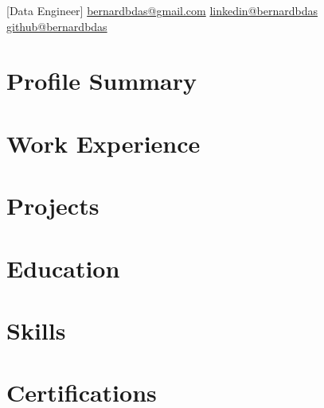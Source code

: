 \documentclass{main}
\begin{document}
[Data Engineer]{%
  \contactline%
  {\href{mailto:bernardbdas@gmail.com}{bernardbdas@gmail.com}}%
  {\href{https://linkedin.com/in/bernardbdas}{linkedin@bernardbdas}}%
  {\href{https://github.com/bernardbdas}{github@bernardbdas}}%
}


\begin{minipage}[t]{0.65\textwidth}

  \section{Profile Summary}
  
  \sectionsep

  \section{Work Experience}
  
  \sectionsep

  \section{Projects}
  
  \sectionsep

  \section{Education}
  

\end{minipage}%
\hfill
\begin{minipage}[t]{0.32\textwidth}

  \section{Skills}
  
  \sectionsep

  \section{Certifications}
  

\end{minipage}
\end{document}
